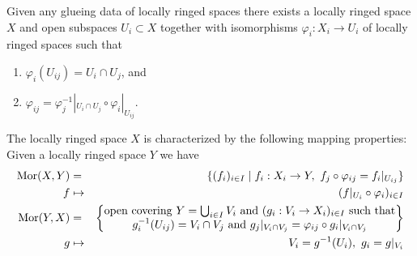 \begin{lemma}
\label{lemma-glue}
Given any glueing data of locally ringed spaces there
exists a locally ringed space $X$ and open subspaces
$U_i \subset X$ together with isomorphisms
$\varphi_i : X_i \to U_i$ of locally ringed spaces such that
\begin{enumerate}
\item $\varphi_i(U_{ij}) = U_i \cap U_j$, and
\item $\varphi_{ij} =
\varphi_j^{-1}|_{U_i \cap U_j} \circ \varphi_i|_{U_{ij}}$.
\end{enumerate}
The locally ringed space $X$ is characterized by the following
mapping properties: Given a locally ringed space $Y$ we have
\begin{eqnarray*}
\mathop{\rm Mor}\nolimits(X, Y) & = & \{ (f_i)_{i\in I} \mid
f_i : X_i \to Y, \ f_j \circ \varphi_{ij} = f_i|_{U_{ij}}\} \\
f & \mapsto & (f|_{U_i} \circ \varphi_i)_{i \in I} \\
\mathop{\rm Mor}\nolimits(Y, X) & = &
\left\{
\begin{matrix}
\text{open covering }Y = \bigcup\nolimits_{i \in I} V_i\text{ and }
(g_i : V_i \to X_i)_{i \in I}
\text{ such that}\\
g_i^{-1}(U_{ij}) = V_i \cap V_j
\text{ and }
g_j|_{V_i \cap V_j} = \varphi_{ij} \circ g_i|_{V_i \cap V_j}
\end{matrix}
\right\} \\
g & \mapsto &
V_i = g^{-1}(U_i), \ g_i = g|_{V_i}
\end{eqnarray*}
\end{lemma}

